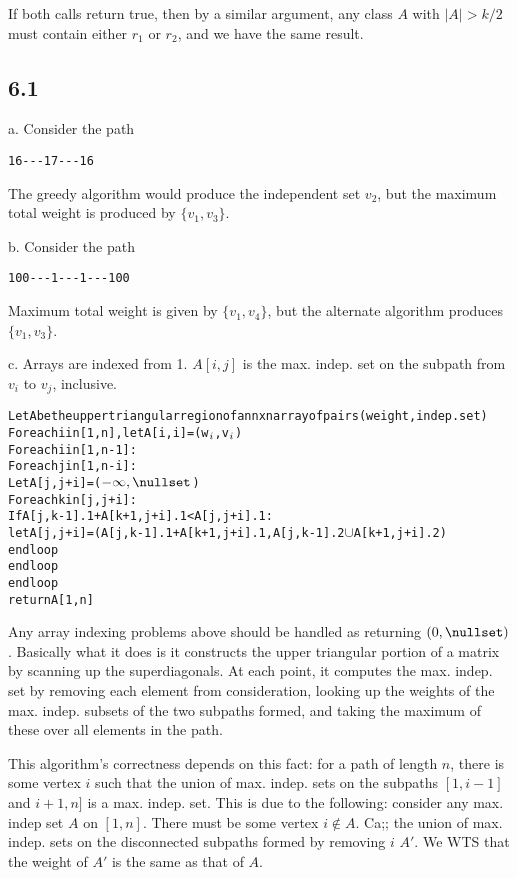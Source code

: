 \documentclass{article}
\begin{document}
If both calls return true, then by a similar argument, any class $A$ with $|A|>k/2$ must contain either $r_1$ or $r_2$, and we have the same result.
\subsection*{6.1}
a. Consider the path \begin{verbatim}16---17---16\end{verbatim} The greedy algorithm would produce the independent set $v_2$, but the maximum total weight is produced by $\{v_1,v_3\}$.

\noindent b. Consider the path \begin{verbatim}100---1---1---100\end{verbatim} Maximum total weight is given by $\{v_1,v_4\}$, but the alternate algorithm produces $\{v_1,v_3\}$.

\noindent c. Arrays are indexed from 1. $A[i,j]$ is the max. indep. set on the subpath from $v_i$ to $v_j$, inclusive.
\begin{alltt}
Let A be the upper triangular region of an nxn array of pairs (weight, indep. set)
For each i in [1,n], let A[i,i]=(w\(\sb{i}\),v\(\sb{i}\))
For each i in [1,n-1]:
    For each j in [1,n-i]:
        Let A[j,j+i]=(\(-\infty,\nullset\))
        For each k in [j,j+i]:
            If A[j,k-1].1+A[k+1,j+i].1<A[j,j+i].1:
                let A[j,j+i]=(A[j,k-1].1+A[k+1,j+i].1,A[j,k-1].2\(\cup\)A[k+1,j+i].2)
        end loop
    end loop
end loop
return A[1,n]
\end{alltt}

Any array indexing problems above should be handled as returning $(0,\nullset)$. Basically what it does is it constructs the upper triangular portion of a matrix by scanning up the superdiagonals. At each point, it computes the max. indep. set by removing each element from consideration, looking up the weights of the max. indep. subsets of the two subpaths formed, and taking the maximum of these over all elements in the path.

This algorithm's correctness depends on this fact: for a path of length $n$, there is some vertex $i$ such that the union of max. indep. sets on the subpaths $[1,i-1]$ and $i+1,n]$ is a max. indep. set. This is due to the following: consider any max. indep set $A$ on $[1,n]$. There must be some vertex $i\not\in A$. Ca;; the union of max. indep. sets on the disconnected subpaths formed by removing $i$ $A'$. We WTS that the weight of $A'$ is the same as that of $A$. 
\end{document}
